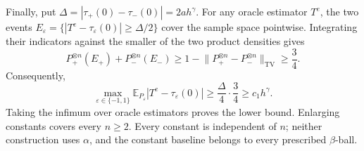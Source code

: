Finally, put \(\Delta=|\tau_+(0)-\tau_-(0)|=2ah^\gamma\).  For any oracle estimator \(T^e\), the two events \(E_\varepsilon=\{|T^e-\tau_\varepsilon(0)|\geq\Delta/2\}\) cover the sample space pointwise.  Integrating their indicators against the smaller of the two product densities gives
\[
 P_+^{\otimes n}(E_+)+P_-^{\otimes n}(E_-)
 \geq1-\lVert P_+^{\otimes n}-P_-^{\otimes n}\rVert_{\mathrm{TV}}
 \geq\frac34.
\]
Consequently,
\[
 \max_{\varepsilon\in\{-1,1\}}
 \mathbb E_{P_\varepsilon}|T^e-\tau_\varepsilon(0)|
 \geq\frac{\Delta}{4}\cdot\frac34
 \geq c_1h^\gamma.
\]
Taking the infimum over oracle estimators proves the lower bound.  Enlarging constants covers every \(n\geq2\).  Every constant is independent of \(n\); neither construction uses \(\alpha\), and the constant baseline belongs to every prescribed \(\beta\)-ball.
